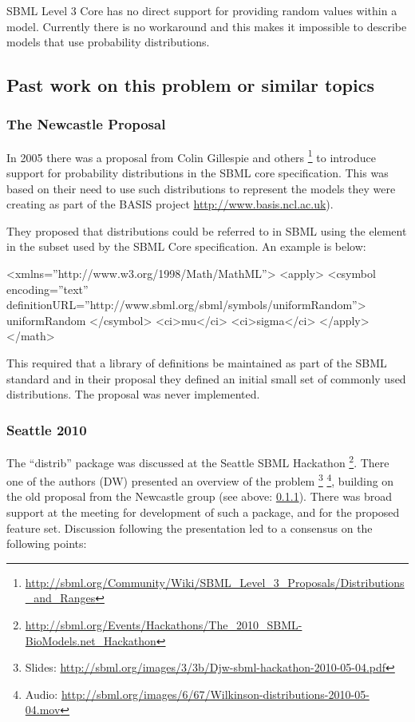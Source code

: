 \documentclass[draftspec]{sbmlpkgspec}
\begin{document}
SBML Level 3 Core has no direct support for providing random values
within a model. Currently there is no workaround and this makes it
impossible to describe models that use probability distributions.

\subsection{Past work on this problem or similar topics}

\subsubsection{The Newcastle Proposal}
\label{sec:newcastle proposal}

In 2005 there was a proposal from Colin Gillespie and others
\footnote{\url{http://sbml.org/Community/Wiki/SBML_Level_3_Proposals/Distributions_and_Ranges}}
to introduce support for probability distributions in the SBML core specification. This
was based on their need to use such distributions to represent the
models they were creating as part of the BASIS project
\url{http://www.basis.ncl.ac.uk}).

They proposed that distributions could be referred to in SBML using
the  element in the \mathml subset used by
the SBML Core specification. An example is below:

\begin{example}
<xmlns=''http://www.w3.org/1998/Math/MathML''>
  <apply>
    <csymbol encoding=''text''
        definitionURL=''http://www.sbml.org/sbml/symbols/uniformRandom''>
      uniformRandom
    </csymbol>
    <ci>mu</ci>
    <ci>sigma</ci>
  </apply>
</math>
\end{example}

This required that a library of definitions be maintained as part of
the SBML standard and in their proposal they defined an initial small
set of commonly used distributions. The proposal was never
implemented.

\subsubsection{Seattle 2010}

The ``distrib'' package was discussed at the Seattle SBML Hackathon%
\footnote{\url{http://sbml.org/Events/Hackathons/The_2010_SBML-BioModels.net_Hackathon}}. There
one of the authors (DW) presented an overview of the problem%
\footnote{Slides:
 \url{http://sbml.org/images/3/3b/Djw-sbml-hackathon-2010-05-04.pdf}}%
\footnote{Audio:
  \url{http://sbml.org/images/6/67/Wilkinson-distributions-2010-05-04.mov}},
building on the old proposal from the Newcastle group
 (see above: \ref{sec:newcastle proposal}).
There was broad support at the meeting for development of such a
package, and for the proposed feature set. Discussion following the
presentation led to a consensus on the following points:
\end{document}
